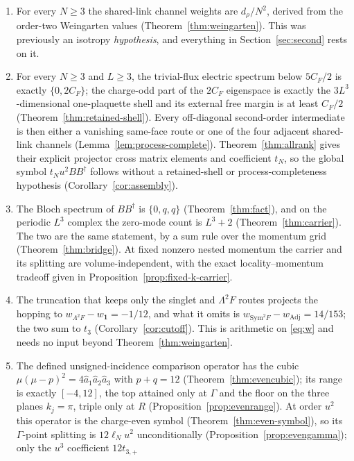 \documentclass[11pt]{article}
\theoremstyle{plain}
\theoremstyle{definition}
\theoremstyle{remark}
\newcommand{\dg}{^{\dagger}}
\begin{document}
\begin{enumerate}\itemsep2pt
\item For every $N\ge3$ the shared-link channel weights are $d_\rho/N^2$,
  derived from the order-two Weingarten values
  (Theorem~\ref{thm:weingarten}). This was previously an isotropy
  \emph{hypothesis}, and everything in Section~\ref{sec:second} rests on it.
\item For every $N\ge3$ and $L\ge3$, the trivial-flux electric spectrum below
  $5C_F/2$ is exactly $\{0,2C_F\}$; the charge-odd part of the $2C_F$
  eigenspace is exactly the $3L^3$-dimensional one-plaquette shell and its
  external free margin is at least $C_F/2$
  (Theorem~\ref{thm:retained-shell}). Every off-diagonal
  second-order intermediate is then either a vanishing same-face route or one
  of the four adjacent shared-link channels
  (Lemma~\ref{lem:process-complete}). Theorem~\ref{thm:allrank} gives their
  explicit projector cross matrix elements and coefficient $t_N$, so the
  global symbol $t_Nu^2BB\dg$ follows without a retained-shell or
  process-completeness hypothesis (Corollary~\ref{cor:assembly}).
\item The Bloch spectrum of $BB\dg$ is $\{0,q,q\}$ (Theorem~\ref{thm:fact}),
  and on the periodic $L^3$ complex the zero-mode count is $L^3+2$
  (Theorem~\ref{thm:carrier}). The two are the same statement, by a sum rule
  over the momentum grid (Theorem~\ref{thm:bridge}). At fixed nonzero nested
  momentum the carrier and its splitting are volume-independent, with the
  exact locality--momentum tradeoff given in
  Proposition~\ref{prop:fixed-k-carrier}.
\item\label{item:cutoff} The truncation that keeps only the singlet and $\Lambda^2F$ routes
  projects the hopping to $w_{\Lambda^2F}-w_{\mathbf 1}=-1/12$, and what it
  omits is $w_{\mathrm{Sym}^2F}-w_{\mathrm{Adj}}=14/153$; the two sum to
  $t_3$ (Corollary~\ref{cor:cutoff}). This is arithmetic on
  \eqref{eq:w} and needs no input beyond Theorem~\ref{thm:weingarten}.
\item The defined unsigned-incidence comparison operator has the cubic
  $\mu(\mu-p)^2=4\hat a_1\hat a_2\hat a_3$ with $p+q=12$
  (Theorem~\ref{thm:evencubic}); its range is exactly $[-4,12]$, the top
  attained only at $\Gamma$ and the floor on the three planes $k_j=\pi$, triple
  only at $R$ (Proposition~\ref{prop:evenrange}). At order $u^2$ this
  operator is the charge-even symbol (Theorem~\ref{thm:even-symbol}), so its
  $\Gamma$-point splitting is $12\ell_Nu^2$ unconditionally
  (Proposition~\ref{prop:evengamma}); only the $u^3$ coefficient $12t_{3,+}$

\end{enumerate}
\end{document}

